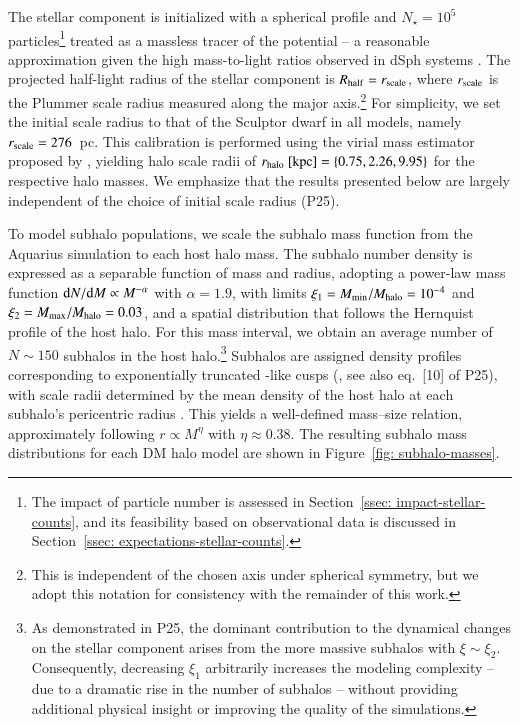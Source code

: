 \documentclass[fleqn,usenatbib]{mnras}
\newcommand{\diff}{{\rm d}}
\begin{document}
The stellar component is initialized with a spherical \citet{Plummer1911} profile and $N_{\star} = 10^{5}$ particles\footnote{The impact of particle number is assessed in Section~\ref{ssec: impact-stellar-counts}, and its feasibility based on observational data is discussed in Section~\ref{ssec: expectations-stellar-counts}.}  treated as a massless tracer of the potential -- a reasonable approximation given the high mass-to-light ratios observed in dSph systems \citep[][and references therein]{Simon19}. The projected half-light radius of the stellar component is $R_{\rm half} = r_{\rm scale}$, where $r_{\rm scale}$ is the Plummer scale radius measured along the major axis.\footnote{This is independent of the chosen axis under spherical symmetry, but we adopt this notation for consistency with the remainder of this work.}
For simplicity, we set the initial scale radius to that of the Sculptor dwarf in all models, namely $r_{\rm scale} = 276$~pc.
This calibration is performed using the virial mass estimator proposed by \citet{Errani+18}, yielding halo scale radii of $r_{\rm halo}~[{\rm kpc}] = \{ 0.75, 2.26, 9.95 \}$ for the respective halo masses. We emphasize that the results presented below are largely independent of the choice of initial scale radius (P25).

To model subhalo populations, we scale the subhalo mass function from the Aquarius simulation \citep{Springel+08} to each host halo mass. The subhalo number density is expressed as a separable function of mass and radius, adopting a power-law mass function $\diff N/\diff M \propto M^{-\alpha}$ with $\alpha = 1.9$, with limits $\xi_1=M_{\rm min}/M_{\rm halo}=10^{-4}$ and $\xi_2=M_{\rm max}/M_{\rm halo}=0.03$, and a spatial distribution that follows the Hernquist profile of the host halo. For this mass interval, we obtain an average  number of $N \sim 150$ subhalos in the host halo.\footnote{As demonstrated in P25, the dominant contribution to the dynamical changes on the stellar component arises from the more massive subhalos with $\xi\sim \xi_2$. Consequently, decreasing $\xi_1$ arbitrarily increases the modeling complexity -- due to a dramatic rise in the number of subhalos -- without providing additional physical insight or improving the quality of the simulations.} Subhalos are assigned density profiles corresponding to exponentially truncated \citet*{Navarro+97}-like cusps (\citealt{Errani&Navarro21}, see also eq.~[10] of P25), with scale radii determined by the mean density of the host halo at each subhalo's pericentric radius \citep{Errani&Navarro21,Aguirre-Santaella+23}. This yields a well-defined mass–size relation, approximately following $r \propto M^{\eta}$ with $\eta \approx 0.38$. The resulting subhalo mass distributions for each DM halo model are shown in Figure~\ref{fig: subhalo-masses}.
\end{document}
